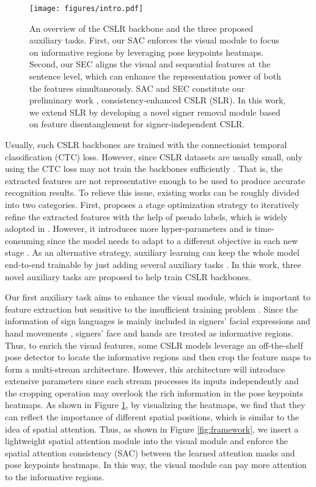 \documentclass[acmsmall,screen]{acmart}
\begin{document}
\begin{figure}[t]
  \centering
   \texttt{[image: figures/intro.pdf]}
   \caption{An overview of the CSLR backbone and the three proposed auxiliary tasks. First, our SAC enforces the visual module to focus on informative regions by leveraging pose keypoints heatmaps. Second, our SEC aligns the visual and sequential features at the sentence level, which can enhance the representation power of both the features simultaneously. SAC and SEC constitute our preliminary work \cite{zuo2022c2slr}, consistency-enhanced CSLR (SLR). In this work, we extend SLR by developing a novel signer removal module based on feature disentanglement for signer-independent CSLR.}
   \label{fig:intro}
\end{figure}

Usually, such CSLR backbones are trained with the connectionist temporal classification (CTC) \cite{ctc} loss.
However, since CSLR datasets are usually small, only using the CTC loss may not train the backbones sufficiently \cite{iopt, dnf, cma, stmc, self-mutual, fcn, vac}.
That is, the extracted features are not representative enough to be used to produce accurate recognition results.
To relieve this issue, existing works can be roughly divided into two categories.
First, \cite{dnf} proposes a stage optimization strategy to iteratively refine the extracted features with the help of pseudo labels, which is widely adopted in \cite{dilated, iopt, cma, stmc, self-mutual}.
However, it introduces more hyper-parameters and is time-consuming since the model needs to adapt to a different objective in each new stage \cite{fcn}.
As an alternative strategy, auxiliary learning can keep the whole model end-to-end trainable by just adding several auxiliary tasks \cite{fcn, vac}.
In this work, three novel auxiliary tasks are proposed to help train CSLR backbones.

Our first auxiliary task aims to enhance the visual module, which is important to feature extraction but sensitive to the insufficient training problem \cite{vac, dnf, stmc}.
Since the information of sign languages is mainly included in signers' facial expressions and hand movements \cite{stmc, koller2020quantitative, hu2021global}, signers' face and hands are treated as informative regions.
Thus, to enrich the visual features, some CSLR models \cite{stmc, stmc_jour, papadimitriou20_interspeech} leverage an off-the-shelf pose detector \cite{cao2019openpose, sun2019deep} to locate the informative regions and then crop the feature maps to form a multi-stream architecture.
However, this architecture will introduce extensive parameters since each stream processes its inputs independently and the cropping operation may overlook the rich information in the pose keypoints heatmaps.
As shown in Figure \ref{fig:intro}, by visualizing the heatmaps, we find that they can reflect the importance of different spatial positions, which is similar to the idea of spatial attention.
Thus, as shown in Figure \ref{fig:framework}, we insert a lightweight spatial attention module into the visual module and enforce the spatial attention consistency (SAC) between the learned attention masks and pose keypoints heatmaps.
In this way, the visual module can pay more attention to the informative regions.
\end{document}
